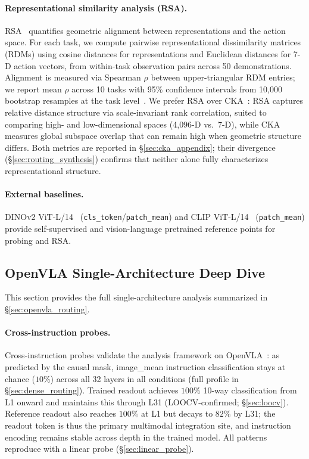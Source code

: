 \paragraph{Representational similarity analysis (RSA).}
RSA~\cite{kriegeskorte2008} quantifies geometric alignment between representations and the action space.
For each task, we compute pairwise representational dissimilarity matrices (RDMs) using cosine distances for representations and Euclidean distances for 7-D action vectors, from within-task observation pairs across 50 demonstrations.
Alignment is measured via Spearman $\rho$ between upper-triangular RDM entries; we report mean $\rho$ across 10 tasks with 95\% confidence intervals from 10{,}000 bootstrap resamples at the task level~\cite{nili2014toolbox}.
We prefer RSA over CKA~\cite{kornblith2019}: RSA captures relative distance structure via scale-invariant rank correlation, suited to comparing high- and low-dimensional spaces (4{,}096-D vs.\ 7-D), while CKA measures global subspace overlap that can remain high when geometric structure differs.
Both metrics are reported in \S\ref{sec:cka_appendix}; their divergence (\S\ref{sec:routing_synthesis}) confirms that neither alone fully characterizes representational structure.

\paragraph{External baselines.}
DINOv2 ViT-L/14~\cite{oquab2024_dinov2} (\texttt{cls\_token}/\texttt{patch\_mean}) and CLIP ViT-L/14~\cite{radford2021_clip} (\texttt{patch\_mean}) provide self-supervised and vision-language pretrained reference points for probing and RSA.

\subsection{OpenVLA Single-Architecture Deep Dive}
\label{sec:openvla_deepdive_appendix}

This section provides the full single-architecture analysis summarized in \S\ref{sec:openvla_routing}.

\paragraph{Cross-instruction probes.}
Cross-instruction probes validate the analysis framework on OpenVLA~\cite{kim2024_openvla}: as predicted by the causal mask, image\_mean instruction classification stays at chance ($10\%$) across all 32 layers in all conditions (full profile in \S\ref{sec:dense_routing}).
Trained readout achieves $100\%$ 10-way classification from L1 onward and maintains this through L31 (LOOCV-confirmed; \S\ref{sec:loocv}).
Reference readout also reaches $100\%$ at L1 but decays to $82\%$ by L31; the readout token is thus the primary multimodal integration site, and instruction encoding remains stable across depth in the trained model.
All patterns reproduce with a linear probe (\S\ref{sec:linear_probe}).

